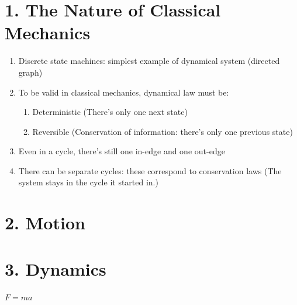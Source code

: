 \section{1. The Nature of  Classical Mechanics}
\begin{enumerate}
\item Discrete state machines: simplest example of dynamical system (directed graph)
\item To be valid in classical mechanics, dynamical law must be:
  \begin{enumerate}
  \item Deterministic (There's only one next state)
  \item Reversible (Conservation of information: there's only one previous state)
  \end{enumerate}
\item Even in a cycle, there's still one in-edge and one out-edge
\item There can be separate cycles: these correspond to conservation laws (The system stays in the cycle it started in.)
\end{enumerate}

\section{2. Motion}

\section{3. Dynamics}
$F = ma$
